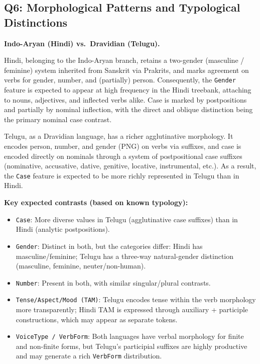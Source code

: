 \documentclass[12pt,a4paper]{article}
\begin{document}
\subsection{Q6: Morphological Patterns and Typological Distinctions}

\textbf{Indo-Aryan (Hindi) vs.\ Dravidian (Telugu).}

Hindi, belonging to the Indo-Aryan branch, retains a two-gender (masculine /
feminine) system inherited from Sanskrit via Prakrits, and marks agreement on
verbs for gender, number, and (partially) person.  Consequently, the
\texttt{Gender} feature is expected to appear at high frequency in the Hindi
treebank, attaching to nouns, adjectives, and inflected verbs alike.  Case is
marked by postpositions and partially by nominal inflection, with the direct
and oblique distinction being the primary nominal case contrast.

Telugu, as a Dravidian language, has a richer agglutinative morphology.  It
encodes person, number, and gender (PNG) on verbs via suffixes, and case is
encoded directly on nominals through a system of postpositional case suffixes
(nominative, accusative, dative, genitive, locative, instrumental, etc.).  As
a result, the \texttt{Case} feature is expected to be more richly represented
in Telugu than in Hindi.

\textbf{Key expected contrasts (based on known typology):}
\begin{itemize}[leftmargin=1.5em]
  \item \texttt{Case}: More diverse values in Telugu (agglutinative case
        suffixes) than in Hindi (analytic postpositions).
  \item \texttt{Gender}: Distinct in both, but the categories differ: Hindi has
        masculine/feminine; Telugu has a three-way natural-gender distinction
        (masculine, feminine, neuter/non-human).
  \item \texttt{Number}: Present in both, with similar singular/plural contrasts.
  \item \texttt{Tense/Aspect/Mood (TAM)}: Telugu encodes tense within the verb
        morphology more transparently; Hindi TAM is expressed through auxiliary
        + participle constructions, which may appear as separate tokens.
  \item \texttt{VoiceType / VerbForm}: Both languages have verbal morphology for
        finite and non-finite forms, but Telugu's participial suffixes are highly
        productive and may generate a rich \texttt{VerbForm} distribution.
\end{itemize}
\end{document}
